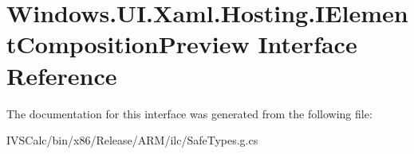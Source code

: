 \hypertarget{interface_windows_1_1_u_i_1_1_xaml_1_1_hosting_1_1_i_element_composition_preview}{}\section{Windows.\+U\+I.\+Xaml.\+Hosting.\+I\+Element\+Composition\+Preview Interface Reference}
\label{interface_windows_1_1_u_i_1_1_xaml_1_1_hosting_1_1_i_element_composition_preview}


The documentation for this interface was generated from the following file\+:\begin{DoxyCompactItemize}
\item 
I\+V\+S\+Calc/bin/x86/\+Release/\+A\+R\+M/ilc/Safe\+Types.\+g.\+cs\end{DoxyCompactItemize}
